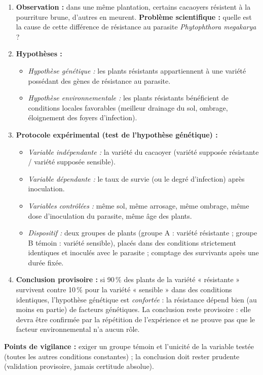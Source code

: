 \documentclass[11pt]{article}
\newcommand{\cle}[1]{{\popxbold\color{popdark}#1}}
\begin{document}
\begin{corrige}
\begin{enumerate}
    \item \textbf{Observation :} dans une même plantation, certains cacaoyers résistent à la pourriture brune, d'autres en meurent. \textbf{Problème scientifique :} quelle est la cause de cette différence de résistance au parasite \emph{Phytophthora megakarya} ?
    \item \textbf{Hypothèses :}
    \begin{itemize}
        \item \emph{Hypothèse génétique :} les plants résistants appartiennent à une variété possédant des gènes de résistance au parasite.
        \item \emph{Hypothèse environnementale :} les plants résistants bénéficient de conditions locales favorables (meilleur drainage du sol, ombrage, éloignement des foyers d'infection).
    \end{itemize}
    \item \textbf{Protocole expérimental (test de l'hypothèse génétique) :}
    \begin{itemize}
        \item \emph{Variable indépendante :} la variété du cacaoyer (variété supposée résistante / variété supposée sensible).
        \item \emph{Variable dépendante :} le taux de survie (ou le degré d'infection) après inoculation.
        \item \emph{Variables contrôlées :} même sol, même arrosage, même ombrage, même dose d'inoculation du parasite, même âge des plants.
        \item \emph{Dispositif :} deux groupes de plants (groupe A : variété résistante ; groupe B témoin : variété sensible), placés dans des conditions strictement identiques et inoculés avec le parasite ; comptage des survivants après une durée fixée.
    \end{itemize}
    \item \textbf{Conclusion provisoire :} si \num{90}\,\% des plants de la variété « résistante » survivent contre \num{10}\,\% pour la variété « sensible » dans des conditions identiques, l'hypothèse génétique est \emph{confortée} : la résistance dépend bien (au moins en partie) de facteurs génétiques. La conclusion reste \cle{provisoire} : elle devra être confirmée par la répétition de l'expérience et ne prouve pas que le facteur environnemental n'a aucun rôle.
\end{enumerate}
\textbf{Points de vigilance :} exiger un \cle{groupe témoin} et l'unicité de la variable testée (toutes les autres conditions constantes) ; la conclusion doit rester prudente (validation provisoire, jamais certitude absolue).
\end{corrige}
\end{document}
